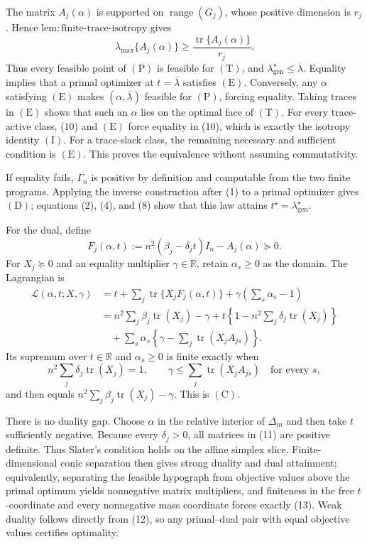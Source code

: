The matrix \(A_j(\alpha)\) is supported on \(\operatorname{range}(G_j)\), whose positive dimension is \(r_j\).  Hence \(\mathrm{lem:finite\text{-}trace\text{-}isotropy}\) gives
\[
\lambda_{\max}\{A_j(\alpha)\}
\ge\frac{\operatorname{tr}\{A_j(\alpha)\}}{r_j}.
\tag{10}
\]
Thus every feasible point of \((\mathrm P)\) is feasible for \((\mathrm T)\), and \(\lambda_{\mathrm{gen}}^\star\le\overline\lambda\).  Equality implies that a primal optimizer at \(t=\overline\lambda\) satisfies \((\mathrm E)\).  Conversely, any \(\alpha\) satisfying \((\mathrm E)\) makes \((\alpha,\overline\lambda)\) feasible for \((\mathrm P)\), forcing equality.  Taking traces in \((\mathrm E)\) shows that such an \(\alpha\) lies on the optimal face of \((\mathrm T)\).  For every trace-active class, (10) and \((\mathrm E)\) force equality in (10), which is exactly the isotropy identity \((\mathrm I)\).  For a trace-slack class, the remaining necessary and sufficient condition is \((\mathrm E)\).  This proves the equivalence without assuming commutativity.

If equality fails, \(\Gamma_n\) is positive by definition and computable from the two finite programs.  Applying the inverse construction after (1) to a primal optimizer gives \((\mathrm D)\); equations (2), (4), and (8) show that this law attains \(t^\star=\lambda_{\mathrm{gen}}^\star\).

For the dual, define
\[
F_j(\alpha,t)
:=n^2(\beta_j-\delta_jt)I_n-A_j(\alpha)\succeq0.
\tag{11}
\]
For \(X_j\succeq0\) and an equality multiplier \(\gamma\in\mathbb R\), retain \(\alpha_s\ge0\) as the domain.  The Lagrangian is
\[
\begin{aligned}
\mathcal L(\alpha,t;X,\gamma)
&=t+\sum_j\operatorname{tr}\{X_jF_j(\alpha,t)\}
+\gamma\left(\sum_s\alpha_s-1\right)\\
&=n^2\sum_j\beta_j\operatorname{tr}(X_j)-\gamma
+t\left\{1-n^2\sum_j\delta_j\operatorname{tr}(X_j)\right\}\\
&\quad+\sum_s\alpha_s
\left\{\gamma-\sum_j\operatorname{tr}(X_jA_{js})\right\}.
\end{aligned}
\tag{12}
\]
Its supremum over \(t\in\mathbb R\) and \(\alpha_s\ge0\) is finite exactly when
\[
n^2\sum_j\delta_j\operatorname{tr}(X_j)=1,
\qquad
\gamma\le\sum_j\operatorname{tr}(X_jA_{js})
\quad\text{for every }s,
\tag{13}
\]
and then equals \(n^2\sum_j\beta_j\operatorname{tr}(X_j)-\gamma\).  This is \((\mathrm C)\).

There is no duality gap.  Choose \(\alpha\) in the relative interior of \(\Delta_m\) and then take \(t\) sufficiently negative.  Because every \(\delta_j>0\), all matrices in (11) are positive definite.  Thus Slater's condition holds on the affine simplex slice.  Finite-dimensional conic separation then gives strong duality and dual attainment; equivalently, separating the feasible hypograph from objective values above the primal optimum yields nonnegative matrix multipliers, and finiteness in the free \(t\)-coordinate and every nonnegative mass coordinate forces exactly (13).  Weak duality follows directly from (12), so any primal--dual pair with equal objective values certifies optimality.

